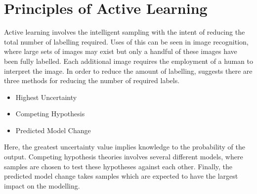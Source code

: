 \section{Principles of Active Learning}
Active learning involves the intelligent sampling with the intent of reducing the total number of labelling required. Uses of this can be seen in image recognition, where large sets of images may exist but only a handful of these images have been fully labelled. Each additional image requires the employment of a human to interpret the image. In order to reduce the amount of labelling, \cite{activeLearning} suggests there are three methods for reducing the number of required labels.
\begin{itemize}
    \item Highest Uncertainty
    \item Competing Hypothesis
    \item Predicted Model Change
\end{itemize}
Here, the greatest uncertainty value implies knowledge to the probability of the output. Competing hypothesis theories involves several different models, where samples are chosen to test these hypotheses against each other. Finally, the predicted model change takes samples which are expected to have the largest impact on the modelling.